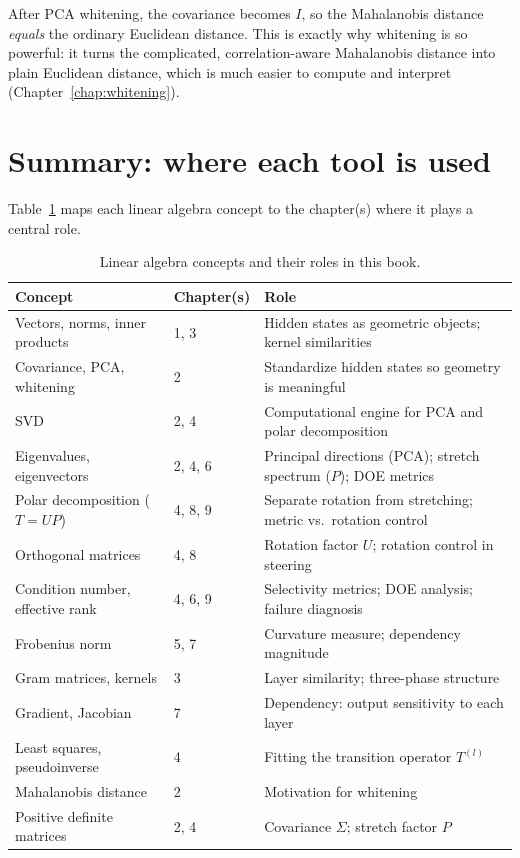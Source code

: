 \documentclass[11pt, twoside, openright]{memoir}
\begin{document}
\begin{keyidea}
After PCA whitening, the covariance becomes $I$, so the Mahalanobis
distance \emph{equals} the ordinary Euclidean distance.  This is exactly
why whitening is so powerful: it turns the complicated, correlation-aware
Mahalanobis distance into plain Euclidean distance, which is much easier
to compute and interpret (Chapter~\ref{chap:whitening}).
\end{keyidea}

\section{Summary: where each tool is used}

Table~\ref{tab:la-roadmap} maps each linear algebra concept to the
chapter(s) where it plays a central role.

\begin{table}[H]
\centering
\caption{Linear algebra concepts and their roles in this book.}
\label{tab:la-roadmap}
\small
\begin{tabularx}{\textwidth}{@{}l l X@{}}
\toprule
\textbf{Concept} & \textbf{Chapter(s)} & \textbf{Role} \\
\midrule
Vectors, norms, inner products & 1, 3
  & Hidden states as geometric objects; kernel similarities \\
Covariance, PCA, whitening & 2
  & Standardize hidden states so geometry is meaningful \\
SVD & 2, 4
  & Computational engine for PCA and polar decomposition \\
Eigenvalues, eigenvectors & 2, 4, 6
  & Principal directions (PCA); stretch spectrum ($P$); DOE metrics \\
Polar decomposition ($T = UP$) & 4, 8, 9
  & Separate rotation from stretching; metric vs.\ rotation control \\
Orthogonal matrices & 4, 8
  & Rotation factor $U$; rotation control in steering \\
Condition number, effective rank & 4, 6, 9
  & Selectivity metrics; DOE analysis; failure diagnosis \\
Frobenius norm & 5, 7
  & Curvature measure; dependency magnitude \\
Gram matrices, kernels & 3
  & Layer similarity; three-phase structure \\
Gradient, Jacobian & 7
  & Dependency: output sensitivity to each layer \\
Least squares, pseudoinverse & 4
  & Fitting the transition operator $T^{(l)}$ \\
Mahalanobis distance & 2
  & Motivation for whitening \\
Positive definite matrices & 2, 4
  & Covariance $\Sigma$; stretch factor $P$ \\
\bottomrule
\end{tabularx}
\end{table}
\end{document}

